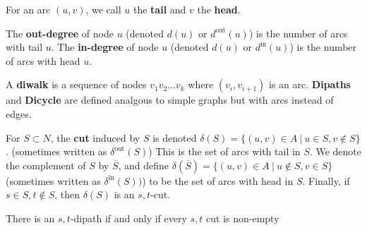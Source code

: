 \documentclass[../main.tex]{subfiles}
\begin{document}
\begin{definition}{}{}
  For an arc $(u,v)$, we call $u$ the \textbf{tail} and $v$ the \textbf{head}.

  The \textbf{out-degree} of node $u$ (denoted $d(u)$ or $d^{\text{out}}(u)$) is the number of arcs with tail $u$. The \textbf{in-degree} of node $u$ (denoted $d(\overline{u})$ or $d^{\text{in}}(u)$) is the number of arcs with head $u$.

  A \textbf{diwalk} is a sequence of nodes $v_1v_2\ldots v_k$ where $(v_i, v_{i+1})$ is an arc. \textbf{Dipaths} and \textbf{Dicycle} are defined analgous to simple graphs but with arcs instead of edges.

  For $S \subset N$, the \textbf{cut} induced by $S$ is denoted $\delta(S) = \{ (u,v) \in A \:\rvert\: u \in S, v \not\in S \}$. (sometimes written as $\delta^{\text{out}}(S)$) This is the set of arcs with tail in $S$.
  We denote the complement of $S$ by $\overline{S}$, and define $\delta(\overline{S}) = \{ (u,v) \in A \:\rvert\: u \not\in S, v \in S \}$ (sometimes written as $\delta^{\text{in}}(S))$) to be the set of arcs with head in $S$. Finally, if $s \in S, t \not\in S$, then $\delta(S)$ is an $s,t$-cut.
\end{definition}

\begin{theorem}{}{}
  There is an $s,t$-dipath if and only if every $s,t$ cut is non-empty
\end{theorem}
\end{document}
